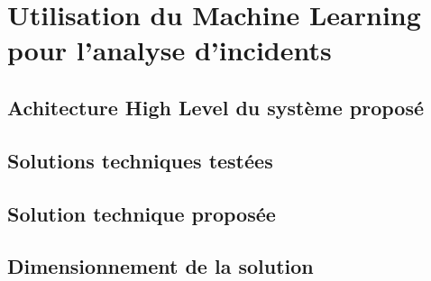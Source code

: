 \chapter{Utilisation du Machine Learning pour l'analyse d'incidents}
\label{Utilisation du Machine Learning pour l'analyse d'incidents}
\thispagestyle{fancy}

\section{Achitecture High Level du système proposé}
\label{Utilisation du Machine Learning pour l'analyse d'incidents: Achitecture High Level du système proposé}

\section{Solutions techniques testées}
\label{Utilisation du Machine Learning pour l'analyse d'incidents: Solutions techniques testées}

\section{Solution technique proposée}
\label{Utilisation du Machine Learning pour l'analyse d'incidents: Solution technique proposée}

\section{Dimensionnement de la solution}
\label{Utilisation du Machine Learning pour l'analyse d'incidents: Dimensionnement de la solution}